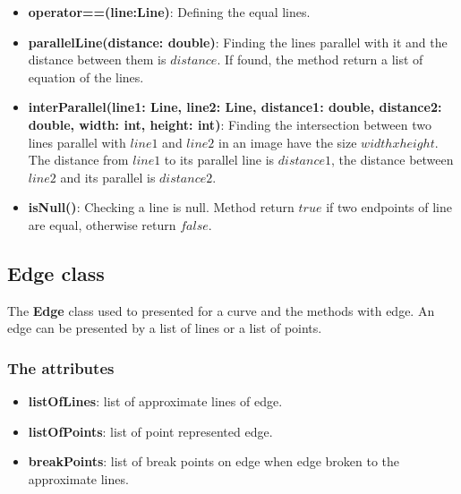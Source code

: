 \begin{itemize}
\item\textbf{operator==(line:Line)}: Defining the equal lines.
\item\textbf{parallelLine(distance: double)}: Finding the lines parallel with it and the distance between them is $distance$. If found, the method return a list of equation of the lines.
\item\textbf{interParallel(line1: Line, line2: Line, distance1: double, distance2: double, width: int, height: int)}: Finding the intersection between two lines parallel with $line1$ and $line2$ in an image have the size $width x height$. The distance from $line1$ to its parallel line is $distance1$, the distance between $line2$ and its parallel is $distance2$.
\item\textbf{isNull()}: Checking a line is null. Method return $true$ if two endpoints of line are equal, otherwise return $false$.
\end{itemize}
\subsection{Edge class}
The \textbf{Edge} class used to presented for a curve and the methods with edge. An edge can be presented by a list of lines or a list of points.
\subsubsection{The attributes}
\begin{itemize}
\item\textbf{listOfLines}: list of approximate lines of edge.
\item\textbf{listOfPoints}: list of point represented edge.
\item\textbf{breakPoints}: list of break points on edge when edge broken to the approximate lines.
\end{itemize}
